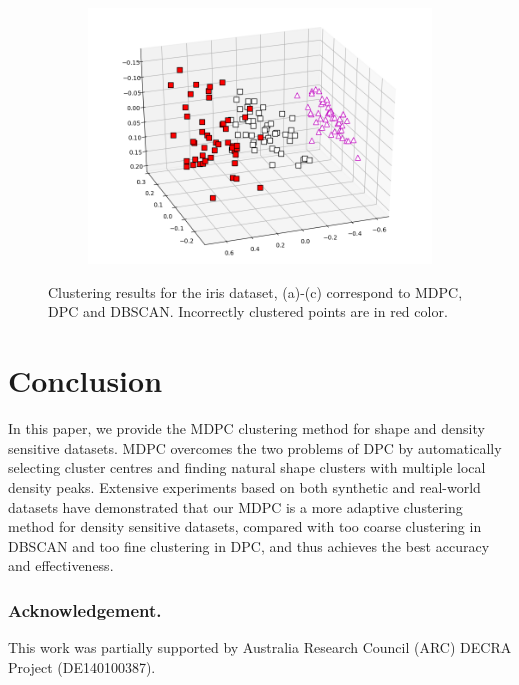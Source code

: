\documentclass{llncs}
\def\ackname{Acknowledgement.}
\begin{document}
\begin{figure}[ht]
\begin{subfigure}[t]{0.32\textwidth}
\end{subfigure}
\begin{subfigure}[t]{0.32\textwidth}
\centering
\includegraphics[width=1\textwidth]{image/iris_dbscan.png}
\end{subfigure}
\caption{Clustering results for the iris dataset, (a)-(c) correspond to MDPC, DPC and DBSCAN. Incorrectly clustered points are in red color.}
\label{fig:iris}
\end{figure}
%
\section{Conclusion}
In this paper, we provide the MDPC clustering method for shape and density sensitive datasets. MDPC overcomes the two problems of DPC by automatically selecting cluster centres and finding natural shape clusters with multiple local density peaks. Extensive experiments based on both synthetic and real-world datasets have demonstrated that our MDPC is a more adaptive clustering method for density sensitive datasets, compared with too coarse clustering in DBSCAN and too fine clustering in DPC, and thus achieves the best accuracy and effectiveness.



\subsubsection*{\ackname}{This work was partially supported by Australia Research Council (ARC) DECRA Project (DE140100387).}


%
%



\clearpage


%
\end{document}
